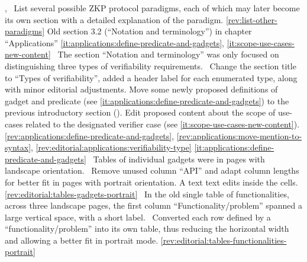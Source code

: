 \rowendL
\newcol 
\newcol {}, 
\newcol \Chan\ List several possible ZKP protocol paradigms, each of which may later 
	become its own section with a detailed explanation of the paradigm.
\newcol \ref{rev:list-other-paradigms}
\rowendL
Old section 3.2 (``Notation and terminology'') in chapter ``Applications''
\newcol 
\newcol \ref{it:applications:define-predicate-and-gadgets}, \ref{it:scope-use-cases-new-content}
\newcol \Note\ The section ``Notation and terminology'' was only focused on distinguishing three types of verifiability requirements.
				\Chan{}ge the section title to ``Types of verifiability'', added a header label for each enumerated type, along with minor editorial adjustments.
				Move some newly proposed definitions of gadget and predicate (see \ref{it:applications:define-predicate-and-gadgets}) to the previous introductory section ().
				Edit proposed content about the scope of use-cases related to the designated verifier case (see \ref{it:scope-use-cases-new-content}).
\newcol \ref{rev:applications:define-predicate-and-gadgets}, \ref{rev:applications:move-mention-to-syntax}, \ref{rev:editorial:applications:verifiability-type}
\rowendL
\newcol 
\newcol \ref{it:applications:define-predicate-and-gadgets}
\newcol \Note\ Tables of individual gadgets were in pages with landscape orientation.
				\Chan\ Remove unused column ``API'' and adapt column lengths for better fit in pages with portrait orientation. A text text edits inside the cells.
\newcol \ref{rev:editorial:tables-gadgets-portrait}
\rowendL
\newcol 
\newcol 
\newcol \Note\ In the old single table of functionalities, across three landscape pages, the first column ``Functionality/problem'' spanned a large vertical space, with a short label.
				\Chan\ Converted each row defined by a ``functionality/problem'' into its own table, thus reducing the horizontal width and allowing a better fit in portrait mode.
\newcol \ref{rev:editorial:tables-functionalities-portrait}
\rowendL
